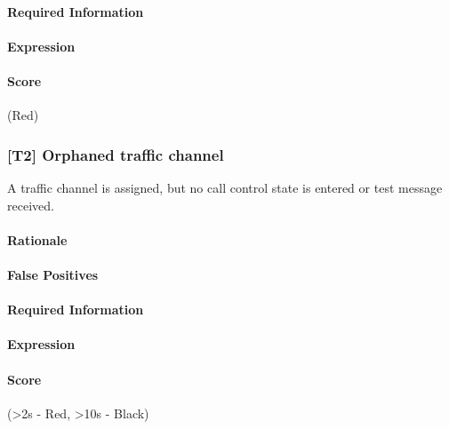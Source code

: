 \documentclass[a4paper,11pt,notitlepage,bigheadings,oneside]{scrartcl}
\begin{document}
\TBD{}

\paragraph{Required Information}

\TBD{}

\paragraph{Expression}

\TBD{}

\paragraph{Score}

\TBD{} (Red)

\subsubsection{[T2] Orphaned traffic channel}

A traffic channel is assigned, but no call control state is entered or test
message received.

\paragraph{Rationale}

\TBD{}

\paragraph{False Positives}

\TBD{}

\paragraph{Required Information}

\TBD{}

\paragraph{Expression}

\TBD{}

\paragraph{Score}

\TBD{} (\textgreater 2s - Red, \textgreater 10s - Black)
\end{document}

